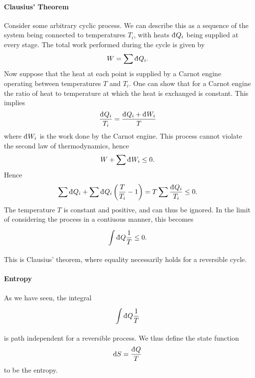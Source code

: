 \paragraph{Clausius' Theorem}
Consider some arbitrary cyclic process. We can describe this as a sequence of the system being connected to temperatures $T_{i}$, with heats $\din{Q_{i}}$ being supplied at every stage. The total work performed during the cycle is given by
\begin{align*}
	W = \sum\din{Q_{i}}.
\end{align*}
Now suppose that the heat at each point is supplied by a Carnot engine operating between temperatures $T$ and $T_{i}$. One can show that for a Carnot engine the ratio of heat to temperature at which the heat is exchanged is constant. This implies
\begin{align*}
	\frac{\din{Q_{i}}}{T_{i}} = \frac{\din{Q_{i}} + \din{W_{i}}}{T}
\end{align*}
where $\din{W_{i}}$ is the work done by the Carnot engine. This process cannot violate the second law of thermodynamics, hence
\begin{align*}
	W + \sum\din{W_{i}} \leq 0.
\end{align*}
Hence
\begin{align*}
	\sum\din{Q_{i}} + \sum\din{Q_{i}}\left(\frac{T}{T_{i}} - 1\right) = T\sum\frac{\din{Q_{i}}}{T_{i}} \leq 0.
\end{align*}
The temperature $T$ is constant and positive, and can thus be ignored. In the limit of considering the process in a contiuous manner, this becomes
\begin{align*}
	\intin{}{}{Q}{\frac{1}{T}} \leq 0.
\end{align*}
This is Clausius' theorem, where equality necessarily holds for a reversible cycle.

\paragraph{Entropy}
As we have seen, the integral
\begin{align*}
	\intin{}{}{Q}{\frac{1}{T}}
\end{align*}
is path independent for a reversible process. We thus define the state function
\begin{align*}
	\dd{S} = \frac{\din{Q}}{T}
\end{align*}
to be the entropy.

